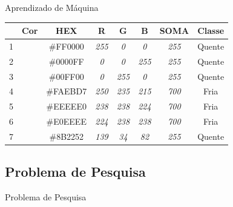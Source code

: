   \begin{frame}[fragile]{Aprendizado de Máquina}
    \begin{table}[]
    \centering
    \label{my-label}
    \begin{tabular}{l|c|c|c|c|c|c|c|}
    \cline{2-8}
                            & \textbf{Cor}           & \textbf{HEX} & \textbf{R}   & \textbf{G}   & \textbf{B}   & \multicolumn{1}{l|}{\textbf{SOMA}} & \textbf{Classe} \\ \hline
    \multicolumn{1}{|l|}{1} & \cellcolor[HTML]{FF0000} & \#FF0000     & \textit{255} & \textit{0}   & \textit{0}   & \textit{255}                       & Quente          \\ \hline
    \multicolumn{1}{|l|}{2} & \cellcolor[HTML]{0000FF} & \#0000FF     & \textit{0}   & \textit{0}   & \textit{255} & \textit{255}                       & Quente          \\ \hline
    \multicolumn{1}{|l|}{3} & \cellcolor[HTML]{00FF00} & \#00FF00     & \textit{0}   & \textit{255} & \textit{0}   & \textit{255}                       & Quente          \\ \hline
    \multicolumn{1}{|l|}{4} & \cellcolor[HTML]{FAEBD7} & \#FAEBD7     & \textit{250} & \textit{235} & \textit{215} & \textit{700}                       & Fria            \\ \hline
    \multicolumn{1}{|l|}{5} & \cellcolor[HTML]{EEEEE0} & \#EEEEE0     & \textit{238} & \textit{238} & \textit{224} & \textit{700}                       & Fria            \\ \hline
    \multicolumn{1}{|l|}{6} & \cellcolor[HTML]{E0EEEE} & \#E0EEEE     & \textit{224} & \textit{238} & \textit{238} & \textit{700}                       & Fria            \\ \hline
    \multicolumn{1}{|l|}{7} & \cellcolor[HTML]{8B2252} & \#8B2252     & \textit{139} & \textit{34}  & \textit{82}  & \textit{255}                       & Quente          \\ \hline
    \end{tabular}
    \end{table}
  \end{frame}

\subsection{Problema de Pesquisa}
  \begin{frame}[fragile]{Problema de Pesquisa}
  \end{frame}
